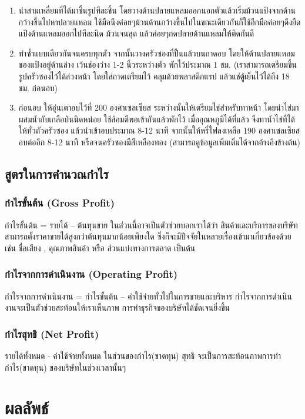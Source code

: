 \documentclass{report}
\begin{document}
\begin{enumerate}
	\item นำสามเหลี่ยมที่ได้มาขึ้นรูปทีละชิ้น โดยวางด้านปลายแหลมออกนอกตัวแล้วเริ่มม้วนแป้งจากด้านกว้างขึ้นไปหาปลายแหลม ใช้มือนึงค่อยๆม้วนด้านกว้างขึ้นไปในขณะเดียวกันก็ใช้อีกมือค่อยๆดึงยืดแป้งด้านแหลมออกไปทีละนิด ม้วนจนสุด แล้วค่อยๆกดปลายด้านแหลมให้ติดกันดี
	\item ทำซ้ำแบบเดียวกันจนครบทุกตัว จากนั้นวางครัวซองที่ปั้นแล้วบนถาดอบ โดยให้ด้านปลายแหลมของแป้งอยู่ด้านล่าง เว้นช่องว่าง 1-2 นิ้วระหว่างตัว พักไว้ประมาณ 1 ชม. (เราสามารถเตรียมขึ้นรูปครัวซองไว้ได้ล่วงหน้า โดยใส่ถาดเตรียมไว้ คลุมด้วยพลาสติกแรป แล้วแช่ตู้เย็นไว้ได้ถึง 18 ชม. ก่อนอบ)
	\item ก่อนอบ ให้อุ่นเตาอบไว้ที่ 200 องศาเซลเซียส ระหว่างนั้นให้เตรียมไข่สำหรับทาหน้า โดยนำไข่มาผสมน้ำกับเกลือป่นนิดหน่อย ใช้ส้อมตีพอเข้ากันแล้วพักไว้ เมื่ออุณหภูมิได้ที่แล้ว จึงทาน้ำไข่ที่ได้ให้ทั่วตัวครัวซอง แล้วนำเข้าอบประมาณ 8-12 นาที จากนั้นให้หรี่ไฟลงเหลือ 190 องศาเซลเซียส อบต่ออีก 8-12 นาที หรือจนครัวซองมีสีเหลืองทอง 
	(สามารถดูข้อมูลเพิ่มเติ่มได้จากอ้างอิงข้างต้น) \cite{DODO}
\end{enumerate}

\section{สูตรในการคำนวณกำไร}
\subsection{กำไรขั้นต้น (Gross Profit)}
กำไรขั้นต้น = รายได้ – ต้นทุนขาย ในส่วนนี้อาจเป็นตัวช่วยบอกเราได้ว่า สินค้าและบริการของบริษัท สามารถตั้งราคาขายได้สูงกว่าต้นทุนมากน้อยเพียงใด ซึ่งก็จะมีปัจจัยในหลายเรื่องเข้ามาเกี่ยวข้องด้วย เช่น ชื่อเสียง , คุณภาพสินค้า หรือ ส่วนแบ่งทางการตลาด เป็นต้น 
\subsection{กำไรจากการดำเนินงาน (Operating Profit)}
กำไรจากการดำเนินงาน = กำไรขั้นต้น – ค่าใช้จ่ายทั่วไปในการขายและบริหาร กำไรจากการดำเนินงานจะเป็นตัวช่วยสะท้อนให้เราเห็นภาพ การทำธุรกิจของบริษัทได้ชัดเจนยิ่งขึ้น 
\subsection{กำไรสุทธิ (Net Profit)}
รายได้ทั้งหมด - ค่าใช้จ่ายทั้งหมด ในส่วนของกำไร(ขาดทุน) สุทธิ จะเป็นการสะท้อนภาพการทำกำไร(ขาดทุน) ของบริษัทในช่วงเวลานั้นๆ

\chapter{ผลลัพธ์} 
\end{document}
